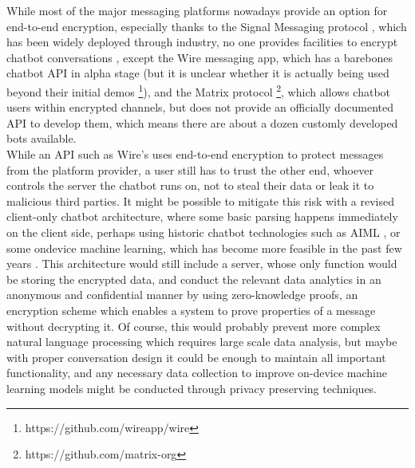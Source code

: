 While most of the major messaging platforms nowadays provide an option for end-to-end encryption, especially thanks to the Signal Messaging protocol \cite{signal}, which has been widely deployed through industry, no one provides facilities to encrypt chatbot conversations \cite{Alesanco2018}, except the Wire messaging app, which has a barebones chatbot API in alpha stage (but it is unclear whether it is actually being used beyond their initial demos \footnote{https://github.com/wireapp/wire}), and the Matrix protocol \footnote{https://github.com/matrix-org}, which allows chatbot users within encrypted channels, but does not provide an officially documented API to develop them, which means there are about a dozen customly developed bots available. \\
While an API such as Wire's uses end-to-end encryption to protect messages from the platform provider, a user still has to trust the other end, whoever controls the server the chatbot runs on, not to steal their data or leak it to malicious third parties. It might be possible to mitigate this risk with a revised client-only chatbot architecture, where some basic parsing happens immediately on the client side, perhaps using historic chatbot technologies such as AIML \cite{aiml}, or some ondevice machine learning, which has become more feasible in the past few years \cite{tensorflow}. This architecture would still include a server, whose only function would be storing the encrypted data, and conduct the relevant data analytics in an anonymous and confidential manner by using zero-knowledge proofs, an encryption scheme which enables a system to prove properties of a message without decrypting it. Of course, this would probably prevent more complex natural language processing which requires large scale data analysis, but maybe with proper conversation design it could be enough to maintain all important functionality, and any necessary data collection to improve on-device machine learning models might be conducted through privacy preserving techniques.
